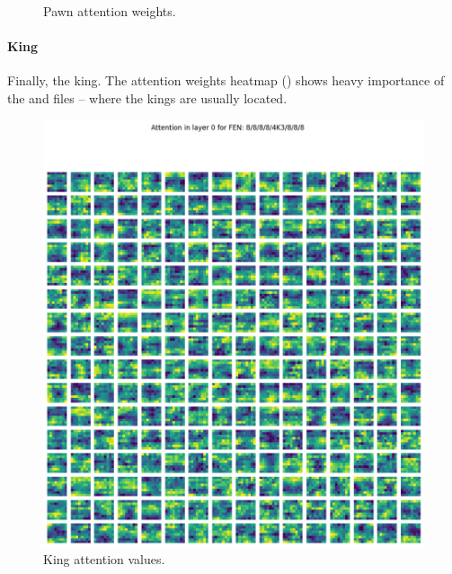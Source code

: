 \begin{figure}[H]
\begin{minipage}{0.475\textwidth}
    \caption{Pawn attention weights.}
    \label{atnP1}
  \end{minipage}
\end{figure}


\paragraph{King} Finally, the king. The attention weights heatmap
() shows heavy importance of the  and  files -- where
the kings are usually located.


\begin{figure}[H]
  \begin{minipage}{0.475\textwidth}
    \centering
    \includegraphics[width=\textwidth]{project/img/attention_maps/K_attention_0.png}
    \caption{King attention values.}
    \label{atnK}
  \end{minipage}
  \hspace{0.05\textwidth}
  \begin{minipage}{0.475\textwidth}
    \centering

\end{minipage}
\end{figure}
